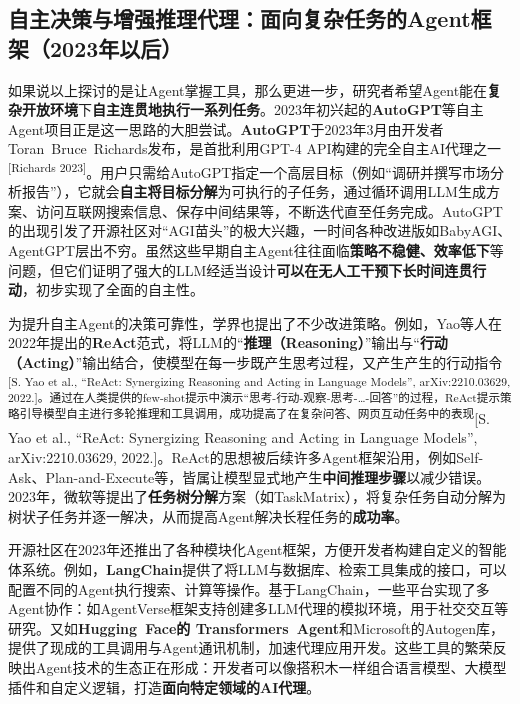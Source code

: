 \documentclass[
  letterpaper,
]{scrbook}
\begin{document}
\subsection{自主决策与增强推理代理：面向复杂任务的Agent框架（2023年以后）}\label{ux81eaux4e3bux51b3ux7b56ux4e0eux589eux5f3aux63a8ux7406ux4ee3ux7406ux9762ux5411ux590dux6742ux4efbux52a1ux7684agentux6846ux67b62023ux5e74ux4ee5ux540e}

如果说以上探讨的是让Agent掌握工具，那么更进一步，研究者希望Agent能在\textbf{复杂开放环境}下\textbf{自主连贯地执行一系列任务}。2023年初兴起的\textbf{AutoGPT}等自主Agent项目正是这一思路的大胆尝试。\textbf{AutoGPT}于2023年3月由开发者Toran~Bruce~Richards发布，是首批利用GPT-4
API构建的完全自主AI代理之一\textsuperscript{{[}Richards
2023{]}}。用户只需给AutoGPT指定一个高层目标（例如``调研并撰写市场分析报告''），它就会\textbf{自主将目标分解}为可执行的子任务，通过循环调用LLM生成方案、访问互联网搜索信息、保存中间结果等，不断迭代直至任务完成。AutoGPT的出现引发了开源社区对``AGI苗头''的极大兴趣，一时间各种改进版如BabyAGI、AgentGPT层出不穷。虽然这些早期自主Agent往往面临\textbf{策略不稳健、效率低下}等问题，但它们证明了强大的LLM经适当设计\textbf{可以在无人工干预下长时间连贯行动}，初步实现了全面的自主性。

为提升自主Agent的决策可靠性，学界也提出了不少改进策略。例如，Yao等人在2022年提出的\textbf{ReAct}范式，将LLM的``\textbf{推理（Reasoning）}''输出与``\textbf{行动（Acting）}''输出结合，使模型在每一步既产生思考过程，又产生产生的行动指令\textsuperscript{{[}S.
Yao et al., ``ReAct: Synergizing Reasoning and Acting in Language
Models'', arXiv:2210.03629,
2022.{]}。通过在人类提供的few-shot提示中演示``思考-行动-观察-思考-\ldots-回答''的过程，ReAct提示策略引导模型自主进行多轮推理和工具调用，成功提高了在复杂问答、网页互动任务中的表现}{[}S.
Yao et al., ``ReAct: Synergizing Reasoning and Acting in Language
Models'', arXiv:2210.03629,
2022.{]}。ReAct的思想被后续许多Agent框架沿用，例如Self-Ask、Plan-and-Execute等，皆属让模型显式地产生\textbf{中间推理步骤}以减少错误。2023年，微软等提出了\textbf{任务树分解}方案（如TaskMatrix），将复杂任务自动分解为树状子任务并逐一解决，从而提高Agent解决长程任务的\textbf{成功率}。

开源社区在2023年还推出了各种模块化Agent框架，方便开发者构建自定义的智能体系统。例如，\textbf{LangChain}提供了将LLM与数据库、检索工具集成的接口，可以配置不同的Agent执行搜索、计算等操作。基于LangChain，一些平台实现了多Agent协作：如AgentVerse框架支持创建多LLM代理的模拟环境，用于社交交互等研究。又如\textbf{Hugging~Face的
Transformers~Agent}和Microsoft的Autogen库，提供了现成的工具调用与Agent通讯机制，加速代理应用开发。这些工具的繁荣反映出Agent技术的生态正在形成：开发者可以像搭积木一样组合语言模型、大模型插件和自定义逻辑，打造\textbf{面向特定领域的AI代理}。
\end{document}
